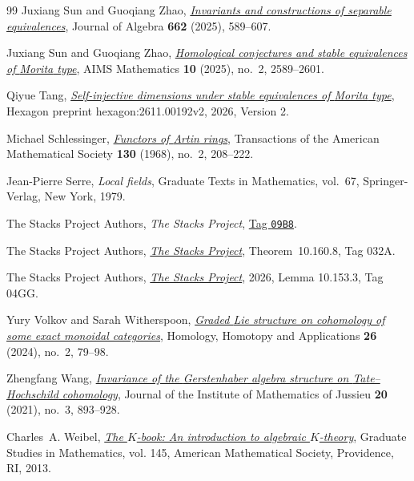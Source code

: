 \documentclass[12pt,a4paper,english,reqno]{amsart}
\numberwithin{equation}{section}
\theoremstyle{plain}
\theoremstyle{definition}
\begin{document}
\begin{thebibliography}{99}
Juxiang Sun and Guoqiang Zhao,
  \emph{\href{https://doi.org/10.1016/j.jalgebra.2024.07.055}{Invariants and
  constructions of separable equivalences}}, Journal of Algebra \textbf{662}
  (2025), 589--607.

Juxiang Sun and Guoqiang Zhao, \emph{\href{https://doi.org/10.3934/math.2025120}{Homological
  conjectures and stable equivalences of {Morita} type}}, AIMS Mathematics
  \textbf{10} (2025), no.~2, 2589--2601.

Qiyue Tang, \emph{\href{https://hexagonmath.org/2611.00192v2}{Self-injective
  dimensions under stable equivalences of {Morita} type}}, Hexagon preprint
  hexagon:2611.00192v2, 2026, Version 2.

Michael Schlessinger, \emph{\href{https://doi.org/10.1090/S0002-9947-1968-0217093-3}
  {Functors of {Artin} rings}}, Transactions of the American Mathematical
  Society \textbf{130} (1968), no.~2, 208--222.

Jean-Pierre Serre, \emph{Local fields}, Graduate Texts in Mathematics,
  vol.~67, Springer-Verlag, New York, 1979.

The Stacks Project Authors, \emph{The Stacks Project},
  \href{https://stacks.math.columbia.edu/tag/09B8}{Tag \texttt{09B8}}.

The Stacks Project Authors,
  \emph{\href{https://stacks.math.columbia.edu/tag/032A}{The Stacks Project}},
  Theorem~10.160.8, Tag 032A.

{The Stacks Project Authors},
  \emph{\href{https://stacks.math.columbia.edu/tag/04GG}{The Stacks Project}},
  2026, Lemma 10.153.3, Tag 04GG.

Yury Volkov and Sarah Witherspoon,
  \emph{\href{https://doi.org/10.4310/HHA.2024.v26.n2.a4}{Graded {Lie}
  structure on cohomology of some exact monoidal categories}}, Homology,
  Homotopy and Applications \textbf{26} (2024), no.~2, 79--98.

Zhengfang Wang,
  \emph{\href{https://doi.org/10.1017/S1474748019000367}{Invariance of the
  {Gerstenhaber} algebra structure on {Tate--Hochschild} cohomology}}, Journal
  of the Institute of Mathematics of Jussieu \textbf{20} (2021), no.~3,
  893--928.

Charles~A. Weibel, \emph{\href{https://doi.org/10.1090/gsm/145}{The {$K$}-book:
  An introduction to algebraic {$K$}-theory}}, Graduate Studies in Mathematics,
  vol. 145, American Mathematical Society, Providence, RI, 2013.


\end{thebibliography}
\end{document}
